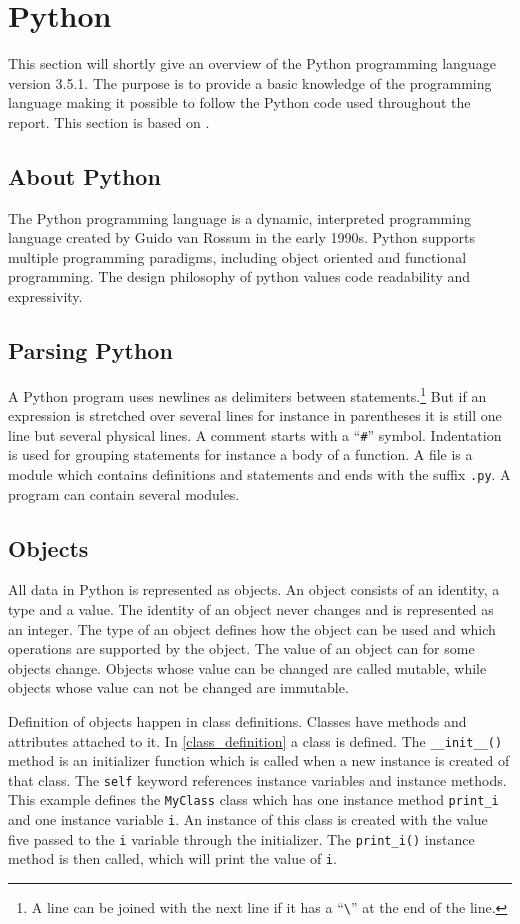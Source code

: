\section{Python}\label{python}
This section will shortly give an overview of the Python programming language version 3.5.1.
The purpose is to provide a basic knowledge of the programming language making it possible to follow the Python code used throughout the report.
This section is based on \citet{python_docs}.

\subsection{About Python}
The Python programming language is a dynamic, interpreted programming language created by Guido van Rossum in the early 1990s.
Python supports multiple programming paradigms, including object oriented and functional programming.
The design philosophy of python values code readability and expressivity.

\subsection{Parsing Python}
A Python program uses newlines as delimiters between statements.\footnote{A line can be joined with the next line if it has a ``\texttt{\textbackslash}'' at the end of the line.}
But if an expression is stretched over several lines for instance in parentheses it is still one line but several physical lines.
A comment starts with a ``\texttt{\#}'' symbol.
Indentation is used for grouping statements for instance a body of a function.
A file is a module which contains definitions and statements and ends with the suffix \texttt{.py}.
A program can contain several modules.

\subsection{Objects}
All data in Python is represented as objects.
An object consists of an identity, a type and a value.
The identity of an object never changes and is represented as an integer.
The type of an object defines how the object can be used and which operations are supported by the object.
The value of an object can for some objects change.
Objects whose value can be changed are called mutable, while objects whose value can not be changed are immutable.

Definition of objects happen in class definitions.
Classes have methods and attributes attached to it.
In \cref{class_definition} a class is defined.
The \texttt{\_\_init\_\_()} method is an initializer function which is called when a new instance is created of that class.
The \texttt{self} keyword references instance variables and instance methods.
This example defines the \texttt{MyClass} class which has one instance method \texttt{print\_i} and one instance variable \texttt{i}.
An instance of this class is created with the value five passed to the \texttt{i} variable through the initializer.
The \texttt{print\_i()} instance method is then called, which will print the value of \texttt{i}.

